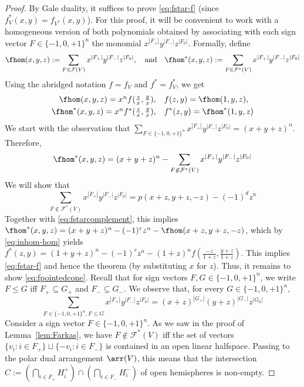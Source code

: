 \begin{proof} By Gale duality, it suffices to prove \eqref{eq:fstar-f} (since $f^*_V(x,y)=f_{V^*}(x,y)$).
%
For this proof, it will be convenient to work with a homogeneous version of both polynomials obtained by associating with each sign vector $F\in \{-1,0,+1\}^n$ the monomial $x^{|F_+|}y^{|F_-|}z^{|F_0|}$. Formally, 
define
\[
\fhom(x,y,z):=\sum_{F\in \mathcal{F}(V)} x^{|F_+|}y^{|F_-|}z^{|F_0|}, \quad \textrm{and}\quad 
\fhom^*(x,y,z):=\sum_{F\in \mathcal{F}^*(V)} x^{|F_+|}y^{|F_-|}z^{|F_0|} 
\]
Using the abridged notation $f=f_V$ and $f^*=f^*_V$, 
we get 
\begin{equation}
\label{eq:inhom-hom}
\begin{split}
\textstyle \fhom(x,y,z) = x^n f(\frac{z}{x}, \frac{y}{x}),\quad &f(z,y)=\fhom(1,y,z), \\
\textstyle \fhom^*(x,y,z) = x^n f^*(\frac{z}{x},\frac{y}{x}),\quad &f^*(z,y)=\fhom^*(1,y,z)
\end{split}
\end{equation}
We start with the observation that $\sum_{F\in \{-1,0,+1\}^n} x^{|F_+|} y^{|F_-|} z^{|F_0|}= (x+y+z)^n$. Therefore, 
\begin{equation}
\label{eq:fstarcomplement}
\fhom^*(x,y,z) =(x+y+z)^n - \sum_{F \not\in \mathcal{F}^*(V)} x^{|F_+|} y^{|F_-|} z^{|F_0|}
\end{equation}
We will show that
\begin{equation}
\label{eq:fpointedcone}
\sum_{F \not\in \mathcal{F}^*(V)} x^{|F_+|} y^{|F_-|} z^{|F_0|} = p(x+z,y+z,-z) -(-1)^d z^n
\end{equation}
Together with \eqref{eq:fstarcomplement}, this implies $\fhom^*(x,y,z) = (x+y+z)^n -(-1)^rz^n - \fhom(x+z,y+z,-z)$, which by \eqref{eq:inhom-hom} yields $f^*(z,y)=(1+y+z)^n -(-1)^r z^n - (1+z)^n f(\frac{-z}{1+z},\frac{y+z}{1+z})$. This implies \eqref{eq:fstar-f} and hence the theorem (by substituting $x$ for $z$). Thus, it remains to show \eqref{eq:fpointedcone}.
%
Recall that for sign vectors $F,G \in \{-1,0,+1\}^n$, we write $F\leq G$ iff $F_+ \subseteq G_+$ and $F_- \subseteq G_-$. 
We observe that, for every $G \in \{-1,0,+1\}^n$,
\begin{equation}
\label{eq:superfaces}
\sum_{F\in \{-1,0,+1\}^n, F\leq G} x^{|F_+|} y^{|F_-|} z^{|F_0|}=(x+z)^{|G_+|} (y+z)^{|G_-|}z^{|G_0|}
\end{equation}
Consider a sign vector $F\in \{-1,0,+1\}^n$. As we saw in the proof of Lemma~\ref{lem:Farkas}, we have $F\not \in \mathcal{F}^*(V)$ iff the set of vectors $\{v_i \colon i\in F_+\} \sqcup \{-v_i \colon i\in F_-\}$ is contained in an open linear halfspace. Passing to the polar dual arrangement $\arr(V)$, this means that the intersection  $C:=(\bigcap_{i \in F_+} H_i^+) \cap (\bigcap_{i \in F_-} H_i^-)$ of open hemispheres is non-empty.

\end{proof}
